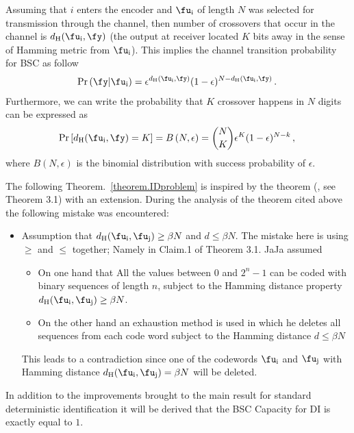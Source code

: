 \begin{remark}
Assuming that $i$ enters the encoder and $\fu_{\text{i}}$ of length $N$ was selected for transmission through the channel, then number of crossovers that occur in the channel is $d_{\text{H}}(\fu_{\text{i}},\fy)$ (the output at receiver located $K$ bits away in the sense of Hamming metric from $\fu_{\text{i}}$). This implies the channel transition probability for BSC as follow
\begin{align}
    \Pr\left(\fy|\fu_{\text{i}}\right) = \epsilon^{d_{\text{H}}(\fu_{\text{i}},\fy)}(1-\epsilon)^{N-d_{\text{H}}(\fu_{\text{i}},\fy)} \, . \,
\end{align}
Furthermore, we can write the probability that $K$ crossover happens in $N$ digits can be expressed as
\begin{align}
    \label{Eq.BinomialDist}
    \Pr\left[d_{\text{H}}(\fu_{\text{i}},\fy)=K\right] = B\left(N,\epsilon\right) = \binom{N}{K} \epsilon^K (1-\epsilon)^{N-k} \, , \,
\end{align}
where $B(N,\epsilon)$ is the binomial distribution with success probability of $\epsilon$. 
\end{remark}
 The following Theorem.~\ref{theorem.IDproblem} is inspired by the theorem (\cite{J85}, see Theorem 3.1) with an extension.
 During the analysis of the theorem cited above the following mistake was encountered: 
 \begin{itemize}
     \item Assumption that $d_{\text{H}}(\fu_{\text{i}},\fu_{\text{j}})\geq \beta N$ and $d\leq \beta N$. The mistake here is using $\geq$ and $\leq$ together; Namely in Claim.1 of Theorem 3.1. JaJa assumed 
     \begin{itemize}
         \item On one hand that All the values between $0$ and $2^n-1$ can be coded with binary sequences of length $n$, subject to the Hamming distance property $d_{\text{H}}(\fu_{\text{i}},\fu_{\text{j}})\geq \beta N$.
         \item On the other hand an exhaustion method is used in which he deletes all sequences from each code word subject to the Hamming distance $d \leq \beta N$
     \end{itemize}
      This leads to a contradiction since one of the codewords $\fu_{\text{i}}$ and $\fu_{\text{j}}$ with Hamming distance $d_{\text{H}}(\fu_{\text{i}},\fu_{\text{j}})=\beta N$ will be deleted.
 \end{itemize}
In addition to the improvements brought to the main result for standard deterministic identification \cite[see Theorem 3.1]{J85} it will be derived that the BSC Capacity for DI is exactly equal to $1$.
